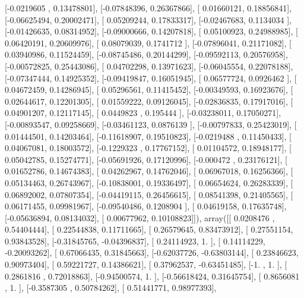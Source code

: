 \documentclass{article}
\begin{document}
       [-0.0219605 ,  0.13478801],
       [-0.07848396,  0.26367866],
       [ 0.01660121,  0.18856841],
       [-0.06625494,  0.20002471],
       [ 0.05209244,  0.17833317],
       [-0.02467683,  0.1134034 ],
       [-0.01426635,  0.08314952],
       [-0.09000666,  0.14207818],
       [ 0.05100923,  0.24988985],
       [ 0.06420191,  0.20609976],
       [ 0.08079039,  0.1741712 ],
       [-0.07896041,  0.21171082],
       [ 0.03940986,  0.11524459],
       [-0.08745486,  0.20144299],
       [-0.09592113,  0.20576958],
       [-0.00572825,  0.25443086],
       [ 0.04702298,  0.13971623],
       [-0.06045554,  0.22078188],
       [-0.07347444,  0.14925352],
       [-0.09419847,  0.16051945],
       [ 0.06577724,  0.0926462 ],
       [ 0.04672459,  0.14286945],
       [ 0.05296561,  0.11415452],
       [-0.00349593,  0.16923676],
       [ 0.02644617,  0.12201305],
       [ 0.01559222,  0.09126045],
       [-0.02836835,  0.17917016],
       [ 0.04901207,  0.12117145],
       [ 0.0449823 ,  0.195444  ],
       [-0.03238011,  0.17050271],
       [-0.00893547,  0.09258669],
       [-0.03461123,  0.0876139 ],
       [-0.00797833,  0.25423019],
       [ 0.01444501,  0.14203464],
       [-0.11618907,  0.19510823],
       [-0.0219488 ,  0.11450433],
       [ 0.04067081,  0.18003572],
       [-0.1229323 ,  0.17767152],
       [ 0.01104572,  0.18948177],
       [ 0.05042785,  0.15274771],
       [-0.05691926,  0.17120996],
       [-0.000472  ,  0.23176121],
       [ 0.01652786,  0.14674383],
       [ 0.04262967,  0.14762046],
       [ 0.06967018,  0.16256366],
       [ 0.05134463,  0.26743967],
       [-0.10838001,  0.19336497],
       [ 0.06654624,  0.26283339],
       [ 0.06892002,  0.07807354],
       [-0.04419115,  0.26456615],
       [ 0.08541398,  0.21405565],
       [ 0.06171455,  0.09981967],
       [-0.09540486,  0.1208904 ],
       [ 0.04619158,  0.17635748],
       [-0.05636894,  0.08134032],
       [ 0.00677962,  0.10108823]]), array([[ 0.0208476 ,  0.54404444],
       [ 0.22544838,  0.11711665],
       [ 0.26579645,  0.83473912],
       [ 0.27551154,  0.93843528],
       [-0.31845765, -0.04396837],
       [ 0.24114923,  1.        ],
       [ 0.14114229, -0.20093262],
       [ 0.67066435,  0.31845663],
       [-0.62037726, -0.63803144],
       [ 0.23846623,  0.90973404],
       [ 0.59221727,  0.14386621],
       [ 0.37962537, -0.63451485],
       [-1.        ,  1.        ],
       [ 0.2861816 ,  0.72018863],
       [-0.94500574,  1.        ],
       [-0.56618424,  0.31645754],
       [ 0.8656081 ,  1.        ],
       [-0.3587305 ,  0.50784262],
       [ 0.51441771,  0.98977393],
\end{document}
